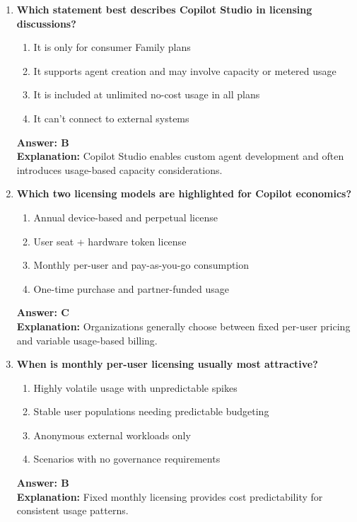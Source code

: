 \documentclass[10pt]{article}
\begin{document}
\begin{enumerate}[leftmargin=*]
\item \textbf{Which statement best describes Copilot Studio in licensing discussions?}
\begin{enumerate}[label=\Alph*.]
  \item It is only for consumer Family plans
  \item It supports agent creation and may involve capacity or metered usage
  \item It is included at unlimited no-cost usage in all plans
  \item It can’t connect to external systems
\end{enumerate}
\textbf{Answer: B}\\
\textbf{Explanation:} Copilot Studio enables custom agent development and often introduces usage-based capacity considerations.

\item \textbf{Which two licensing models are highlighted for Copilot economics?}
\begin{enumerate}[label=\Alph*.]
  \item Annual device-based and perpetual license
  \item User seat + hardware token license
  \item Monthly per-user and pay-as-you-go consumption
  \item One-time purchase and partner-funded usage
\end{enumerate}
\textbf{Answer: C}\\
\textbf{Explanation:} Organizations generally choose between fixed per-user pricing and variable usage-based billing.

\item \textbf{When is monthly per-user licensing usually most attractive?}
\begin{enumerate}[label=\Alph*.]
  \item Highly volatile usage with unpredictable spikes
  \item Stable user populations needing predictable budgeting
  \item Anonymous external workloads only
  \item Scenarios with no governance requirements
\end{enumerate}
\textbf{Answer: B}\\
\textbf{Explanation:} Fixed monthly licensing provides cost predictability for consistent usage patterns.


\end{enumerate}
\end{document}
